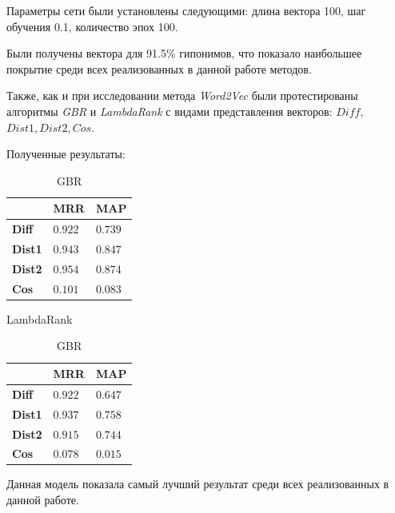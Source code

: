 Параметры сети были установлены следующими: длина вектора 100, шаг обучения 0.1, количество эпох 100.

Были получены вектора для 91.5\% гипонимов, что показало наибольшее покрытие среди
всех реализованных в данной работе методов.

Также, как и при исследовании метода \textit{Word2Vec} были протестированы алгоритмы \textit{GBR} и \textit{LambdaRank} с видами представления векторов: $Diff$,\newline $Dist1, Dist2, Cos$.

Полученные результаты:
\begin{table}[!htb]

\begin{minipage}{.5\textwidth}
\centering
\begin{tabular}{|l|l|l|}
\hline
 & \textbf{MRR} & \textbf{MAP} \\

\hline
\textbf{Diff} & $0.922$ & $0.739$\\

\hline
\textbf{Dist1} & $0.943$ & $0.847$\\

\hline
\textbf{Dist2} & $0.954$ & $0.874$\\

\hline
\textbf{Cos} & $0.101$ & $0.083$\\

\hline
\end{tabular}
\caption{LambdaRank}
\label{tabular:LambdaRank2}
\end{minipage}%
\begin{minipage}{.5\textwidth}
\centering
\begin{tabular}{|l|l|l|}
\hline
 & \textbf{MRR} & \textbf{MAP} \\

\hline
\textbf{Diff} & $0.922$ & $0.647$\\

\hline
\textbf{Dist1} & $0.937$ & $0.758$\\

\hline
\textbf{Dist2} & $0.915$ & $0.744$\\

\hline
\textbf{Cos} & $0.078$ & $0.015$\\

\hline
\end{tabular}
\caption{GBR}
\label{tabular:GBR2}
\end{minipage}

\end{table}

Данная модель показала самый лучший результат среди всех реализованных в данной работе.